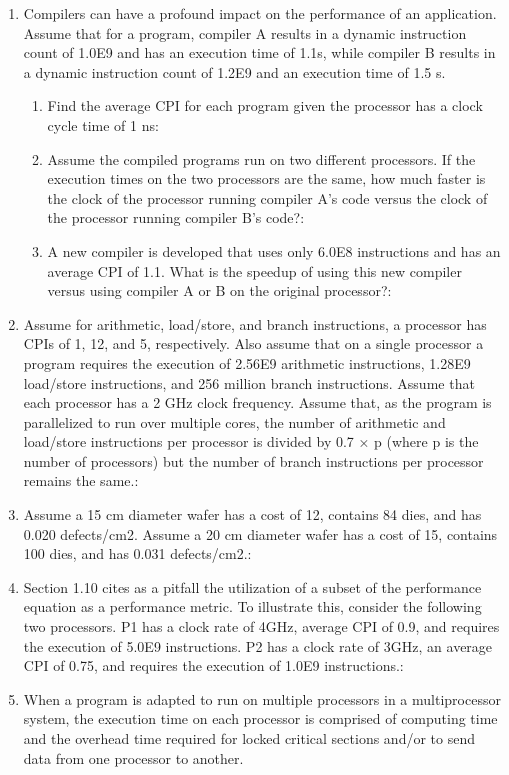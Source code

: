 \documentclass{article}
\begin{document}
\begin{enumerate}
\begin{enumerate}
\end{enumerate}
\item Compilers can have a profound impact on the performance of an application. Assume that for a program, compiler A results in a dynamic instruction count of 1.0E9 and has an execution time of 1.1s, while compiler B results in a dynamic instruction count of 1.2E9 and an execution time of 1.5 s.
\begin{enumerate}
    \item Find the average CPI for each program given the processor has a clock cycle time of 1 ns:
    \item Assume the compiled programs run on two different processors. If the execution times on the two processors are the same, how much faster is the clock of the processor running compiler A’s code versus the clock of the processor running compiler B’s code?:
    \item A new compiler is developed that uses only 6.0E8 instructions and has an average CPI of 1.1. What is the speedup of using this new compiler versus using compiler A or B on the original processor?:
\end{enumerate}
\item Assume for arithmetic, load/store, and branch instructions, a processor has CPIs of 1, 12, and 5, respectively. Also assume that on a single processor a program requires the execution of 2.56E9 arithmetic instructions, 1.28E9 load/store instructions, and 256 million branch instructions. Assume that each processor has a 2 GHz clock frequency.
Assume that, as the program is parallelized to run over multiple cores, the number of arithmetic and load/store instructions per processor is divided by 0.7 × p (where p is the number of processors) but the number of branch instructions per processor remains the same.:
\item Assume a 15 cm diameter wafer has a cost of 12, contains 84 dies, and has 0.020 defects/cm2. Assume a 20 cm diameter wafer has a cost of 15, contains 100 dies, and has 0.031 defects/cm2.:
\item Section 1.10 cites as a pitfall the utilization of a subset of the performance equation as a performance metric. To illustrate this, consider the following two processors. P1 has a clock rate of 4GHz, average CPI of 0.9, and requires the execution of 5.0E9 instructions. P2 has a clock rate of 3GHz, an average CPI of 0.75, and requires the execution of 1.0E9 instructions.:
\item When a program is adapted to run on multiple processors in a multiprocessor system, the execution time on each processor is comprised of computing time and the overhead time required for locked critical sections and/or to send data from one processor to another.

\end{enumerate}
\end{document}
